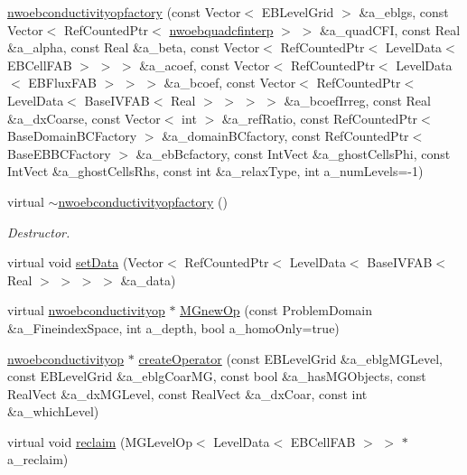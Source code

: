 \begin{DoxyCompactItemize}
\item 
\hyperlink{classnwoebconductivityopfactory_a4fdeaf0374c12e3c408cee11d59b8001}{nwoebconductivityopfactory} (const Vector$<$ E\+B\+Level\+Grid $>$ \&a\+\_\+eblgs, const Vector$<$ Ref\+Counted\+Ptr$<$ \hyperlink{classnwoebquadcfinterp}{nwoebquadcfinterp} $>$ $>$ \&a\+\_\+quad\+C\+FI, const Real \&a\+\_\+alpha, const Real \&a\+\_\+beta, const Vector$<$ Ref\+Counted\+Ptr$<$ Level\+Data$<$ E\+B\+Cell\+F\+AB $>$ $>$ $>$ \&a\+\_\+acoef, const Vector$<$ Ref\+Counted\+Ptr$<$ Level\+Data$<$ E\+B\+Flux\+F\+AB $>$ $>$ $>$ \&a\+\_\+bcoef, const Vector$<$ Ref\+Counted\+Ptr$<$ Level\+Data$<$ Base\+I\+V\+F\+AB$<$ Real $>$ $>$ $>$ $>$ \&a\+\_\+bcoef\+Irreg, const Real \&a\+\_\+dx\+Coarse, const Vector$<$ int $>$ \&a\+\_\+ref\+Ratio, const Ref\+Counted\+Ptr$<$ Base\+Domain\+B\+C\+Factory $>$ \&a\+\_\+domain\+B\+Cfactory, const Ref\+Counted\+Ptr$<$ Base\+E\+B\+B\+C\+Factory $>$ \&a\+\_\+eb\+Bcfactory, const Int\+Vect \&a\+\_\+ghost\+Cells\+Phi, const Int\+Vect \&a\+\_\+ghost\+Cells\+Rhs, const int \&a\+\_\+relax\+Type, int a\+\_\+num\+Levels=-\/1)
\item 
virtual \hyperlink{classnwoebconductivityopfactory_a0f06ec85280bcc4e2da52e59c3e8e47d}{$\sim$nwoebconductivityopfactory} ()
\begin{DoxyCompactList}\small\item\em Destructor. \end{DoxyCompactList}\item 
virtual void \hyperlink{classnwoebconductivityopfactory_a57683019bb115d424032f7f1a7970081}{set\+Data} (Vector$<$ Ref\+Counted\+Ptr$<$ Level\+Data$<$ Base\+I\+V\+F\+AB$<$ Real $>$ $>$ $>$ $>$ \&a\+\_\+data)
\item 
virtual \hyperlink{classnwoebconductivityop}{nwoebconductivityop} $\ast$ \hyperlink{classnwoebconductivityopfactory_a02768db5e811f83ae3f12fe292099f4e}{M\+Gnew\+Op} (const Problem\+Domain \&a\+\_\+\+Fineindex\+Space, int a\+\_\+depth, bool a\+\_\+homo\+Only=true)
\item 
\hyperlink{classnwoebconductivityop}{nwoebconductivityop} $\ast$ \hyperlink{classnwoebconductivityopfactory_abc29f342cb26fead961497ad96428c3d}{create\+Operator} (const E\+B\+Level\+Grid \&a\+\_\+eblg\+M\+G\+Level, const E\+B\+Level\+Grid \&a\+\_\+eblg\+Coar\+MG, const bool \&a\+\_\+has\+M\+G\+Objects, const Real\+Vect \&a\+\_\+dx\+M\+G\+Level, const Real\+Vect \&a\+\_\+dx\+Coar, const int \&a\+\_\+which\+Level)
\item 
virtual void \hyperlink{classnwoebconductivityopfactory_a328811be862a3531d2f30c990c4cb739}{reclaim} (M\+G\+Level\+Op$<$ Level\+Data$<$ E\+B\+Cell\+F\+AB $>$ $>$ $\ast$a\+\_\+reclaim)

\end{DoxyCompactItemize}
